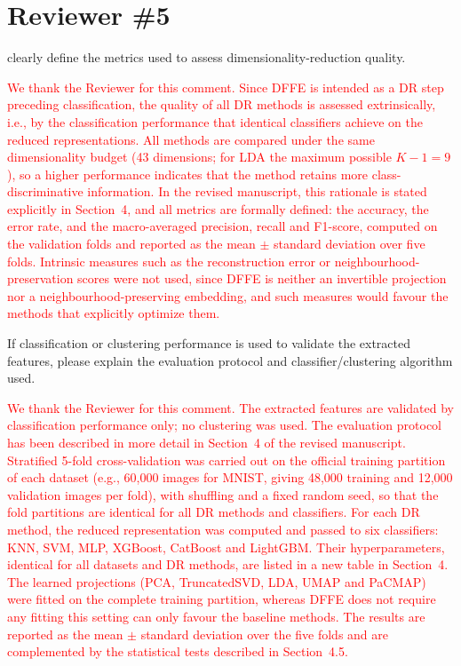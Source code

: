 \documentclass{ar2rc}
\begin{document}
\section*{Reviewer \#5}

\RC %
clearly define the metrics used to assess dimensionality-reduction quality.

\AR
\textcolor{red}{We thank the Reviewer for this comment. Since DFFE is intended as a DR step preceding classification, the quality of all DR methods is assessed extrinsically, i.e., by the classification performance that identical classifiers achieve on the reduced representations. All methods are compared under the same dimensionality budget (43 dimensions; for LDA the maximum possible $K-1 = 9$), so a higher performance indicates that the method retains more class-discriminative information. In the revised manuscript, this rationale is stated explicitly in Section~4, and all metrics are formally defined: the accuracy, the error rate, and the macro-averaged precision, recall and F1-score, computed on the validation folds and reported as the mean $\pm$ standard deviation over five folds. Intrinsic measures such as the reconstruction error or neighbourhood-preservation scores were not used, since DFFE is neither an invertible projection nor a neighbourhood-preserving embedding, and such measures would favour the methods that explicitly optimize them.}


\RC %
If classification or clustering performance is used to validate the extracted features, please explain the evaluation protocol and classifier/clustering algorithm used.


\AR
\textcolor{red}{We thank the Reviewer for this comment. The extracted features are validated by classification performance only; no clustering was used. The evaluation protocol has been described in more detail in Section~4 of the revised manuscript. Stratified 5-fold cross-validation was carried out on the official training partition of each dataset (e.g., 60{,}000 images for MNIST, giving 48{,}000 training and 12{,}000 validation images per fold), with shuffling and a fixed random seed, so that the fold partitions are identical for all DR methods and classifiers. For each DR method, the reduced representation was computed and passed to six classifiers: KNN, SVM, MLP, XGBoost, CatBoost and LightGBM. Their hyperparameters, identical for all datasets and DR methods, are listed in a new table in Section~4. The learned projections (PCA, TruncatedSVD, LDA, UMAP and PaCMAP) were fitted on the complete training partition, whereas DFFE does not require any fitting this setting can only favour the baseline methods. The results are reported as the mean $\pm$ standard deviation over the five folds and are complemented by the statistical tests described in Section~4.5.}
\end{document}

